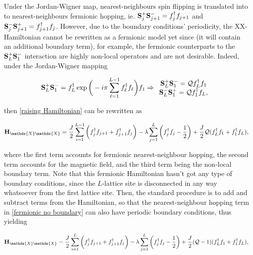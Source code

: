 \documentclass{homework}
\begin{document}
Under the Jordan-Wigner map, nearest-neighbours spin flipping is translated into to nearest-neighbours fermionic hopping, ie. ${\bf S}_{j}^{+} {\bf S}_{j+1}^{-} = f_{j}^{\dagger} f_{j+1}$ and ${\bf S}_{j}^{-} {\bf S}_{j+1}^{+} = f_{j+1}^{\dagger} f_{j}$. However, due to the boundary conditions' periodicity, the XX-Hamiltonian cannot be rewritten as a fermionic model yet since (it will contain an additional boundary term), for example, the fermionic counterparts to the ${\bf S}_{L}^{+} {\bf S}_{1}^{-}$ interaction are highly non-local operators and are not desirable. Indeed, under the Jordan-Wigner mapping 

\begin{equation*}
    {\bf S}_{L}^{+} {\bf S}_{1}^{-} = f_L^\dagger \exp\bigg(-i\pi \sum_{\ell = 1}^{L-1} f_\ell^\dagger f_\ell \bigg) f_1 \Rightarrow \begin{array}{cc}
       {\bf S}_{L}^{+} {\bf S}_{1}^{-} = \mathcal{Q} f_L^\dagger f_1 \\
       {\bf S}_{L}^{-} {\bf S}_{1}^{+} = \mathcal{Q} f_1^\dagger f_L,
    \end{array}
\end{equation*}


then \eqref{raising Hamiltonian} can be rewritten as 

\begin{equation}
    {\bf H}_{\mathds{X}\mathds{X}} = \frac{J}{2} \sum_{i=1}^{L-1} \bigg(f_{j}^{\dagger} f_{j+1} + f_{j+1}^{\dagger} f_j\bigg) - \lambda \sum_{j=1}^{L} \bigg(f_{j}^{\dagger} f_{j} - \frac{1}{2}\bigg) + \frac{J}{2} \mathcal{Q} (f_L^\dagger f_1 + f_1^\dagger f_L),
    \label{fermionic no boundary}
\end{equation}

where the first term accounts for fermionic nearest-neighbour hopping, the second term accounts for the magnetic field, and the third term being the non-local boundary term. Note that this fermionic Hamiltonian hasn't got any type of boundary conditions, since the $L$-lattice site is disconnected in any way whatsoever from the first lattice site. Then, the standard procedure is to add and subtract terms from the Hamiltonian, so that the nearest-neighbour hopping term in \eqref{fermionic no boundary} can also have periodic boundary conditions, thus yielding 

\begin{equation}
    {\bf H}_{\mathds{X}\mathds{X}}  = \frac{J}{2} \sum_{i=1}^{L} \bigg(f_{j}^{\dagger} f_{j+1} + f_{j+1}^{\dagger} f_j\bigg) - \lambda \sum_{j=1}^{L} \bigg(f_{j}^{\dagger} f_{j} - \frac{1}{2}\bigg) + \frac{J}{2} (\mathcal{Q}-1) (f_L^\dagger f_1 + f_1^\dagger f_L),
    \label{true fermionic hamiltonian}
\end{equation}
\end{document}
